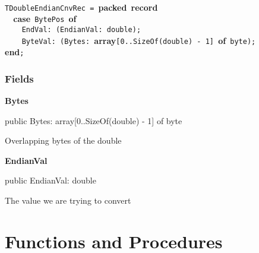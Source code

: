 \documentclass{report}
\newif\ifpdf
\begin{document}
 \texttt{\\\nopagebreak[3]
TDoubleEndianCnvRec~=~}\textbf{packed}\texttt{~}\textbf{record}\texttt{\\\nopagebreak[3]
~~}\textbf{case}\texttt{~BytePos~}\textbf{of}\texttt{\\\nopagebreak[3]
~~~~EndVal:~(EndianVal:~double);\\\nopagebreak[3]
~~~~ByteVal:~(Bytes:~}\textbf{array}\texttt{[0..SizeOf(double)~-~1]~}\textbf{of}\texttt{~byte);\\\nopagebreak[3]
}\textbf{end}\texttt{;\\
}\subsubsection*{\large{\textbf{Fields}}\normalsize\hspace{1ex}\hfill}
\begin{list}{}{
\setlength{\itemindent}{0cm}
\setlength{\listparindent}{0cm}
\setlength{\leftmargin}{\evensidemargin}
\addtolength{\leftmargin}{\tmplength}
\settowidth{\labelsep}{X}
\addtolength{\leftmargin}{\labelsep}
\setlength{\labelwidth}{\tmplength}
}
\label{ok_complicated_record.TDoubleEndianCnvRec-Bytes}
\item[\textbf{Bytes}\hfill]
\ifpdf
\begin{flushleft}
\fi
\begin{ttfamily}
public Bytes: array[0..SizeOf(double) - 1] of byte\end{ttfamily}

\ifpdf
\end{flushleft}
\fi


\par Overlapping bytes of the double\label{ok_complicated_record.TDoubleEndianCnvRec-EndianVal}
\item[\textbf{EndianVal}\hfill]
\ifpdf
\begin{flushleft}
\fi
\begin{ttfamily}
public EndianVal: double\end{ttfamily}

\ifpdf
\end{flushleft}
\fi


\par The value we are trying to convert\end{list}
\section{Functions and Procedures}
\ifpdf
\end{document}
